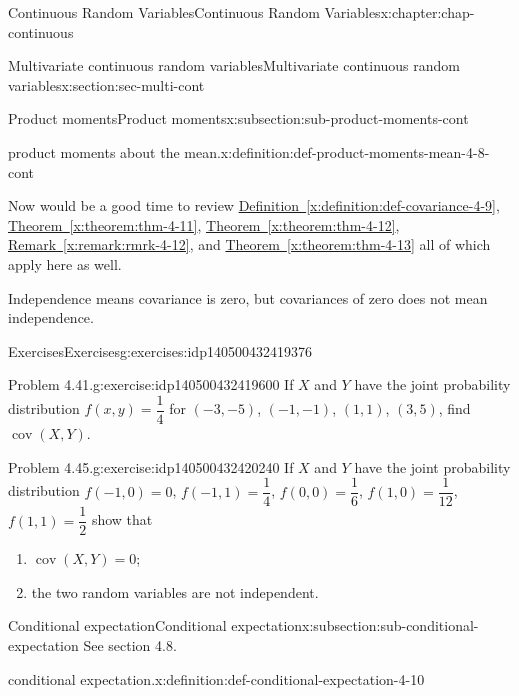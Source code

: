 \documentclass[oneside,10pt,]{book}
\newcommand{\xreffont}{\relax}
\begin{document}
\begin{chapterptx}{Continuous Random Variables}{}{Continuous Random Variables}{}{}{x:chapter:chap-continuous}
\begin{sectionptx}{Multivariate continuous random variables}{}{Multivariate continuous random variables}{}{}{x:section:sec-multi-cont}
\begin{subsectionptx}{Product moments}{}{Product moments}{}{}{x:subsection:sub-product-moments-cont}
\begin{definition}{product moments about the mean.}{x:definition:def-product-moments-mean-4-8-cont}
\end{definition}
Now would be a good time to review \hyperref[x:definition:def-covariance-4-9]{Definition~{\xreffont\ref{x:definition:def-covariance-4-9}}}, \hyperref[x:theorem:thm-4-11]{Theorem~{\xreffont\ref{x:theorem:thm-4-11}}}, \hyperref[x:theorem:thm-4-12]{Theorem~{\xreffont\ref{x:theorem:thm-4-12}}}, \hyperref[x:remark:rmrk-4-12]{Remark~{\xreffont\ref{x:remark:rmrk-4-12}}}, and \hyperref[x:theorem:thm-4-13]{Theorem~{\xreffont\ref{x:theorem:thm-4-13}}} all of which apply here as well.%
\par
Independence means covariance is zero, but covariances of zero does not mean independence.%
\end{subsectionptx}
%
%
\typeout{************************************************}
\typeout{************************************************}
%
\begin{exercises-subsection}{Exercises}{}{Exercises}{}{}{g:exercises:idp140500432419376}
\begin{divisionexercise}{1}{Problem 4.41.}{}{g:exercise:idp140500432419600}%
If \(X\) and \(Y\) have the joint probability distribution \(f(x, y) = \dfrac{1}{4}\) for \((-3, -5)\),  \((-1, -1)\), \((1, 1)\),  \((3, 5)\), find \(\operatorname{cov}(X, Y)\).%
\end{divisionexercise}%
\begin{divisionexercise}{2}{Problem 4.45.}{}{g:exercise:idp140500432420240}%
If \(X\) and \(Y\) have the joint probability distribution \(f(-1, 0) = 0\),  \(f(-1, 1) = \dfrac{1}{4}\), \(f(0, 0) = \dfrac{1}{6}\), \(f(1, 0) = \dfrac{1}{12}\), \(f(1,
1) = \dfrac{1}{2}\) show that%
\begin{enumerate}[label=(\alph*)]
\item{}\(\operatorname{cov}(X, Y) = 0\);%
\item{}the two random variables are not independent.%
\end{enumerate}
%
\end{divisionexercise}%
\end{exercises-subsection}
%
%
\typeout{************************************************}
\typeout{************************************************}
%
\begin{subsectionptx}{Conditional expectation}{}{Conditional expectation}{}{}{x:subsection:sub-conditional-expectation}
See section 4.8.%
\begin{definition}{conditional expectation.}{x:definition:def-conditional-expectation-4-10}%

\end{definition}
\end{subsectionptx}
\end{sectionptx}
\end{chapterptx}
\end{document}
